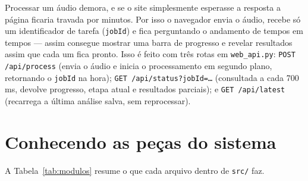 \documentclass[11pt,a4paper]{article}
\begin{document}
Processar um áudio demora, e se o site simplesmente esperasse a resposta a página ficaria travada por minutos. Por isso o navegador envia o áudio, recebe só um identificador de tarefa (\texttt{jobId}) e fica perguntando o andamento de tempos em tempos --- assim consegue mostrar uma barra de progresso e revelar resultados assim que cada um fica pronto. Isso é feito com três rotas em \texttt{web\_api.py}: \texttt{POST /api/process} (envia o áudio e inicia o processamento em segundo plano, retornando o \texttt{jobId} na hora); \texttt{GET /api/status?jobId=\ldots} (consultada a cada 700\,ms, devolve progresso, etapa atual e resultados parciais); e \texttt{GET /api/latest} (recarrega a última análise salva, sem reprocessar).

\section{Conhecendo as peças do sistema}

A Tabela~\ref{tab:modulos} resume o que cada arquivo dentro de \texttt{src/} faz.
\end{document}

